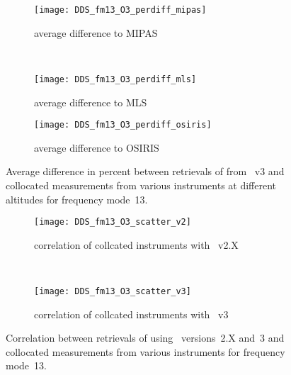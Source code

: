 \begin{figure}[tbhp]
    \centering
    \begin{subfigure}[b]{0.49\textwidth}
        \texttt{[image: DDS\_fm13\_O3\_perdiff\_mipas]}
        \caption{average difference to MIPAS}
        \label{fig:fm13:O3:profiles:MIPAS}
    \end{subfigure}
    \,
    \begin{subfigure}[b]{0.49\textwidth}
        \texttt{[image: DDS\_fm13\_O3\_perdiff\_mls]}
        \caption{average difference to MLS}
        \label{fig:fm13:O3:profiles:MLS}
    \end{subfigure}

    \begin{subfigure}[b]{0.49\textwidth}
        \texttt{[image: DDS\_fm13\_O3\_perdiff\_osiris]}
        \caption{average difference to OSIRIS}
        \label{fig:fm13:O3:profiles:OSIRIS}
    \end{subfigure}
    \caption{Average difference in percent between retrievals of 
    from \smr~v3 and collocated measurements from various instruments at
    different altitudes for frequency mode~13.}

    \label{fig:fm13:O3:profiles}
\end{figure}

\begin{figure}[tbhp]
    \centering
    \begin{subfigure}[b]{0.49\textwidth}
        \texttt{[image: DDS\_fm13\_O3\_scatter\_v2]}
        \caption{correlation of collcated instruments with \smr~v2.X}
        \label{fig:fm13:O3:scatter:v2}
    \end{subfigure}
    \,
    \begin{subfigure}[b]{0.49\textwidth}
        \texttt{[image: DDS\_fm13\_O3\_scatter\_v3]}
        \caption{correlation of collcated instruments with \smr~v3}
        \label{fig:fm13:O3:scatter:v3}
    \end{subfigure}
    \caption{Correlation between retrievals of  using \smr\
    versions~2.X and~3 and collocated measurements from various instruments
    for frequency mode~13.}
    \label{fig:fm13:O3:scatter}
\end{figure}

